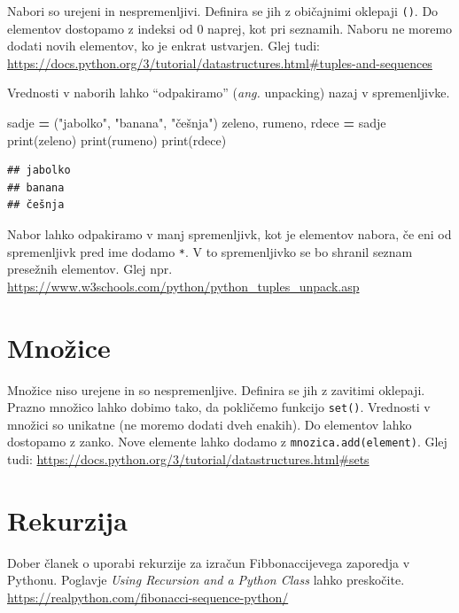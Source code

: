 \documentclass[
]{report}
\newenvironment{Shaded}{\begin{snugshade}}{\end{snugshade}}
\newcommand{\BuiltInTok}[1]{#1}
\newcommand{\NormalTok}[1]{#1}
\newcommand{\OperatorTok}[1]{\textcolor[rgb]{0.81,0.36,0.00}{\textbf{#1}}}
\newcommand{\StringTok}[1]{\textcolor[rgb]{0.31,0.60,0.02}{#1}}
\begin{document}
Nabori so urejeni in nespremenljivi. Definira se jih z običajnimi oklepaji \texttt{()}. Do elementov dostopamo z indeksi od 0 naprej, kot pri seznamih. Naboru ne moremo dodati novih elementov, ko je enkrat ustvarjen. Glej tudi: \url{https://docs.python.org/3/tutorial/datastructures.html\#tuples-and-sequences}

Vrednosti v naborih lahko ``odpakiramo'' (\emph{ang.} unpacking) nazaj v spremenljivke.

\begin{Shaded}
\begin{Highlighting}[]
\NormalTok{sadje }\OperatorTok{=}\NormalTok{ (}\StringTok{"jabolko"}\NormalTok{, }\StringTok{"banana"}\NormalTok{, }\StringTok{"češnja"}\NormalTok{)}
\NormalTok{zeleno, rumeno, rdece }\OperatorTok{=}\NormalTok{ sadje}
\BuiltInTok{print}\NormalTok{(zeleno)}
\BuiltInTok{print}\NormalTok{(rumeno)}
\BuiltInTok{print}\NormalTok{(rdece)}
\end{Highlighting}
\end{Shaded}

\begin{verbatim}
## jabolko
## banana
## češnja
\end{verbatim}

Nabor lahko odpakiramo v manj spremenljivk, kot je elementov nabora, če eni od spremenljivk pred ime dodamo \texttt{*}. V to spremenljivko se bo shranil seznam presežnih elementov. Glej npr. \url{https://www.w3schools.com/python/python_tuples_unpack.asp}

\hypertarget{mnoux17eice}{%
\section{Množice}\label{mnoux17eice}}

Množice niso urejene in so nespremenljive. Definira se jih z zavitimi oklepaji. Prazno množico lahko dobimo tako, da pokličemo funkcijo \texttt{set()}. Vrednosti v množici so unikatne (ne moremo dodati dveh enakih). Do elementov lahko dostopamo z zanko. Nove elemente lahko dodamo z \texttt{mnozica.add(element)}. Glej tudi: \url{https://docs.python.org/3/tutorial/datastructures.html\#sets}

\hypertarget{rekurzija}{%
\section{Rekurzija}\label{rekurzija}}

Dober članek o uporabi rekurzije za izračun Fibbonaccijevega zaporedja v Pythonu. Poglavje \emph{Using Recursion and a Python Class} lahko preskočite. \url{https://realpython.com/fibonacci-sequence-python/}
\end{document}
